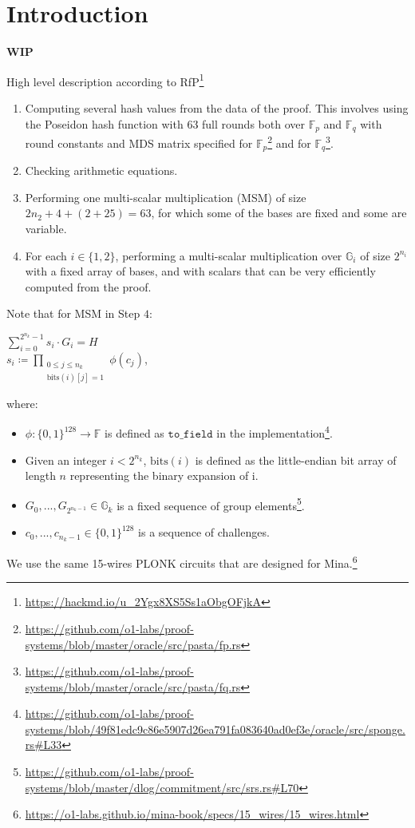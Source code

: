 \section{Introduction}
\label{section:introduction}
\textbf{WIP}

High level description according to RfP\footnote{\url{https://hackmd.io/u_2Ygx8XS5Ss1aObgOFjkA}}
\begin{enumerate}
	\item Computing several hash values from the data of the proof. 
This involves using the Poseidon hash function with 63 full rounds both over $\mathbb{F}_p$ and $\mathbb{F}_q$ 
with round constants and MDS matrix specified for $\mathbb{F}_p$\footnote{\url{https://github.com/o1-labs/proof-systems/blob/master/oracle/src/pasta/fp.rs}} 
and for $\mathbb{F}_q$\footnote{\url{https://github.com/o1-labs/proof-systems/blob/master/oracle/src/pasta/fq.rs}}.
	\item Checking arithmetic equations.
	\item Performing one multi-scalar multiplication (MSM) of size $2n_2 + 4 + (2 + 25) = 63$,
for which some of the bases are fixed and some are variable.
	\item For each $i \in \{1, 2\}$, performing a multi-scalar multiplication over $\mathbb{G}_i$ of size $2^{n_i}$
with a fixed array of bases, and with scalars that can be very efficiently computed from the proof.
\end{enumerate}

Note that for MSM in Step $4$:
\begin{center}
	$\sum\limits_{i = 0}^{2^{n_k} - 1}s_i \cdot G_i = H$ \\
	$s_i \coloneqq \prod\limits_{\substack{0 \leq j \leq n_k \\  \text{bits}(i)[j] = 1}} \phi(c_j)$,
\end{center}
where:
\begin{itemize}
	\item $\phi\colon \{0, 1\}^{128} \to \mathbb{F}$ is defined as $\texttt{to\_field}$ in the implementation\footnote{
\url{https://github.com/o1-labs/proof-systems/blob/49f81edc9c86e5907d26ea791fa083640ad0ef3e/oracle/src/sponge.rs\#L33}}.
	\item Given an integer $i < 2^{n_k}$, $\text{bits}(i)$ is defined as the little-endian bit array of length $n$ representing the binary expansion of i. 
	\item $G_0, ..., G_{2^{n_k - 1}} \in \mathbb{G}_k$ is a fixed sequence of group elements\footnote{
\url{https://github.com/o1-labs/proof-systems/blob/master/dlog/commitment/src/srs.rs\#L70}}.
	\item $c_0, ..., c_{n_k -1} \in \{0, 1\}^{128}$ is a sequence of challenges. 
\end{itemize}

We use the same 15-wires PLONK circuits that are designed for Mina.\footnote{\url{https://o1-labs.github.io/mina-book/specs/15_wires/15_wires.html}}